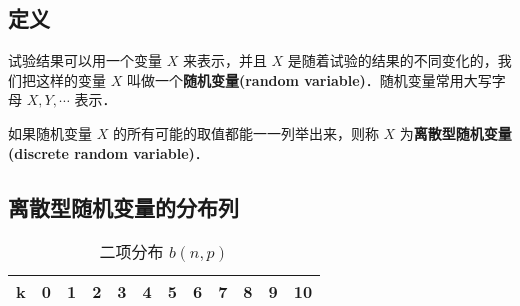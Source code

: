 
\subsection{定义}
试验结果可以用一个变量 $X$ 来表示，并且 $X$ 是随着试验的结果的不同变化的，我们把这样的变量 $X$ 叫做一个\textbf{随机变量(random variable)}．随机变量常用大写字母 $X,Y,\cdots$ 表示．

如果随机变量  $X$ 的所有可能的取值都能一一列举出来，则称 $X$ 为\textbf{离散型随机变量(discrete random variable)}．

\subsection{离散型随机变量的分布列}

\begin{table}[ht]
\centering
\caption{二项分布 $b(n, p)$}\label{HsDRV_tab1}
\begin{tabular}{|c|c|c|c|c|c|c|c|c|c|c|c|}
\hline
k & 0 & 1 & 2 & 3 & 4 & 5 & 6 & 7 & 8 & 9 & 10 \\
\hline
\end{tabular}
\end{table}

